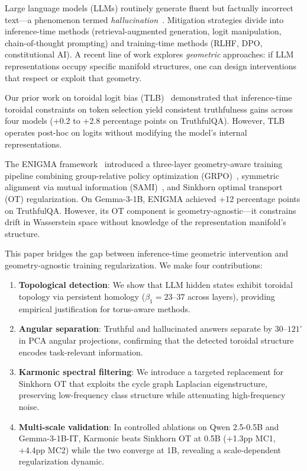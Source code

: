 \documentclass[11pt,a4paper]{article}
\begin{document}
Large language models (LLMs) routinely generate fluent but factually incorrect text---a phenomenon termed \emph{hallucination}~\cite{ji2023hallucination}. Mitigation strategies divide into inference-time methods (retrieval-augmented generation, logit manipulation, chain-of-thought prompting) and training-time methods (RLHF, DPO, constitutional AI). A recent line of work explores \emph{geometric} approaches: if LLM representations occupy specific manifold structures, one can design interventions that respect or exploit that geometry.

Our prior work on toroidal logit bias (TLB)~\cite{cormier2026tlb} demonstrated that inference-time toroidal constraints on token selection yield consistent truthfulness gains across four models (+0.2 to +2.8 percentage points on TruthfulQA). However, TLB operates post-hoc on logits without modifying the model's internal representations.

The ENIGMA framework~\cite{seneque2025enigma} introduced a three-layer geometry-aware training pipeline combining group-relative policy optimization (GRPO)~\cite{shao2024deepseekmath}, symmetric alignment via mutual information (SAMI)~\cite{franken2024sami}, and Sinkhorn optimal transport (OT) regularization. On Gemma-3-1B, ENIGMA achieved +12 percentage points on TruthfulQA. However, its OT component is geometry-agnostic---it constrains drift in Wasserstein space without knowledge of the representation manifold's structure.

This paper bridges the gap between inference-time geometric intervention and geometry-agnostic training regularization. We make four contributions:

\begin{enumerate}
    \item \textbf{Topological detection}: We show that LLM hidden states exhibit toroidal topology via persistent homology ($\beta_1 = 23$--$37$ across layers), providing empirical justification for torus-aware methods.
    \item \textbf{Angular separation}: Truthful and hallucinated answers separate by $30$--$121^\circ$ in PCA angular projections, confirming that the detected toroidal structure encodes task-relevant information.
    \item \textbf{Karmonic spectral filtering}: We introduce a targeted replacement for Sinkhorn OT that exploits the cycle graph Laplacian eigenstructure, preserving low-frequency class structure while attenuating high-frequency noise.
    \item \textbf{Multi-scale validation}: In controlled ablations on Qwen 2.5-0.5B and Gemma-3-1B-IT, Karmonic beats Sinkhorn OT at 0.5B (+1.3pp MC1, +4.4pp MC2) while the two converge at 1B, revealing a scale-dependent regularization dynamic.
\end{enumerate}
\end{document}

